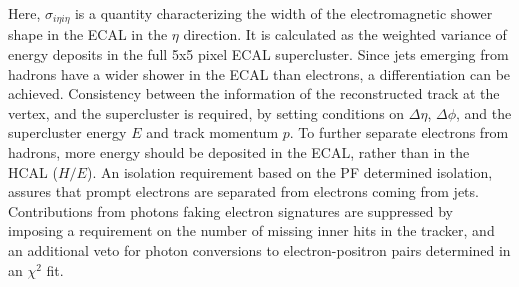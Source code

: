 Here, $\sigma_{i\eta i\eta}$ is a quantity characterizing the width of the electromagnetic shower shape in the ECAL in the $\eta$ direction. It is calculated as the weighted variance of energy deposits in the full 5x5 pixel ECAL supercluster. Since jets emerging from hadrons have a wider shower in the ECAL than electrons, a differentiation can be achieved. Consistency between the information of the reconstructed track at the vertex, and the supercluster is required, by setting conditions on $\Delta\eta$, $\Delta\phi$, and the supercluster energy $E$ and track momentum $p$. To further separate electrons from hadrons, more energy should be deposited in the ECAL, rather than in the HCAL ($H/E$). An isolation requirement based on the PF determined isolation, assures that prompt electrons are separated from electrons coming from \eg jets. Contributions from photons faking electron signatures are suppressed by imposing a requirement on the number of missing inner hits in the tracker, and an additional veto for photon conversions to electron-positron pairs determined in an $\chi^2$ fit.

